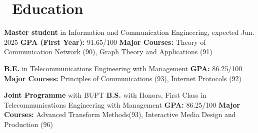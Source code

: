 \documentclass{resume}
\begin{document}



\section{\faGraduationCap\ Education}
\textbf{Master student} in Information and Communication Engineering, expected Jun. 2025 \newline
\textbf{GPA (First Year):} 91.65/100 \newline
\textbf{Major Courses:} Theory of Communication Network (90), Graph Theory and Applications (91)

\textbf{B.E.} in Telecommunications Engineering with Management \newline
\textbf{GPA:} 86.25/100 \newline
\textbf{Major Courses:} Principles of Communications (93), Internet Protocols (92)

\textbf{Joint Programme} with BUPT \newline
\textbf{B.S.} with Honors, First Class in Telecommunications Engineering with Management \newline
\textbf{GPA:} 86.25/100 \newline
\textbf{Major Courses:} Advanced Transform Methods(93), Interactive Media Design and Production (96)
\end{document}
